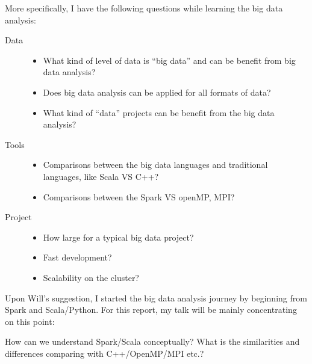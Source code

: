 \documentclass[notheorems, aspectratio=54]{beamer}
\begin{document}
\begin{frame}

More specifically, I have the following questions while learning the big data analysis:

\begin{description}
 \item [Data]
 \begin{itemize}
  \item What kind of level of data is ``big data'' and can be benefit from big data analysis?
  \item Does big data analysis can be applied for all formats of data?
  \item What kind of ``data'' projects can be benefit from the big data analysis?
 \end{itemize}
  \item [Tools]
 \begin{itemize}
  \item Comparisons between the big data languages and traditional languages, like Scala VS C++?
  \item Comparisons between the Spark VS openMP, MPI?  
 \end{itemize}
  \item [Project]
 \begin{itemize}
  \item How large for a typical big data project?
  \item Fast development?
  \item Scalability on the cluster?
 \end{itemize}
\end{description} 

\end{frame}


\begin{frame}

Upon Will's suggestion, I started the big data analysis journey by beginning from Spark and Scala/Python.
For this report, my talk will be mainly concentrating on this point:
\begin{alertblock}{}
 How can we understand Spark/Scala conceptually? What is the similarities and differences comparing with 
 C++/OpenMP/MPI etc.?
\end{alertblock}


\end{frame}
\end{document}
